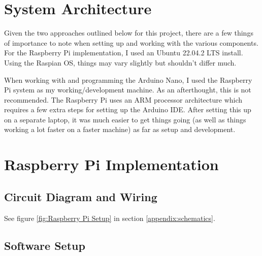 \documentclass{article}
\begin{document}
\begin{multicols}{2}
		\section{System Architecture}
		Given the two approaches outlined below for this project, there are a few things of importance to note when setting up and working with the various components. For the Raspberry Pi implementation, I used an Ubuntu 22.04.2 LTS install. Using the Raspian OS, things may vary slightly but shouldn't differ much.
		
		When working with and programming the Arduino Nano, I used the Raspberry Pi system as my working/development machine. As an afterthought, this is not recommended. The Raspberry Pi uses an ARM processor architecture which requires a few extra steps for setting up the Arduino IDE. After setting this up on a separate laptop, it was much easier to get things going (as well as things working a lot faster on a faster machine) as far as setup and development.
		
		\section{Raspberry Pi Implementation}
		
		\subsection{Circuit Diagram and Wiring}
		See figure \ref{fig:Raspberry Pi Setup} in section \ref{appendix:schematics}.
		
		\subsection{Software Setup}
		

\end{multicols}
\end{document}
